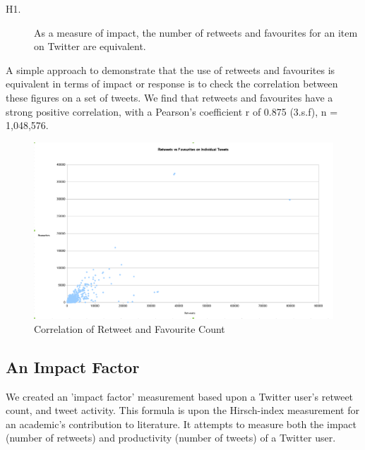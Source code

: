 \begin{description}
 \item [H1.]{As a measure of impact, the number of retweets and favourites for an item on Twitter are equivalent.}
\end{description}

A simple approach to demonstrate that the use of retweets and favourites is equivalent in terms of impact or response is to check the correlation between these figures on a set of tweets. We find that retweets and favourites have a strong positive correlation, with a Pearson's coefficient r of 0.875 (3.s.f), n = 1,048,576. 

\begin{figure}[h!]
\begin{center}
 \centering
\includegraphics[width=500px]{Images/retweets_vs_favourites.pdf}
\caption{Correlation of Retweet and Favourite Count}
\end{center}
\end{figure}



\subsection{An Impact Factor}

We created an 'impact factor' measurement based upon a Twitter user's retweet count, and tweet activity. This formula is upon the Hirsch-index \cite{} measurement for an academic's contribution to literature. It attempts to measure both the impact (number of retweets) and productivity (number of tweets) of a Twitter user. 


